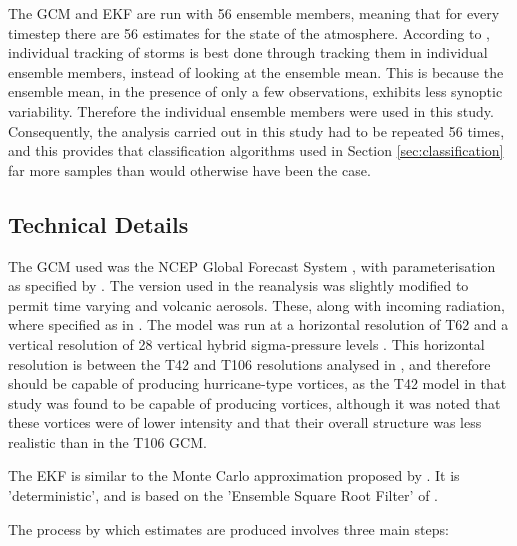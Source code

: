 \documentclass[pdftex,12pt,a4paper]{report}
\begin{document}
The GCM and EKF are run with 56 ensemble members, meaning that for every timestep there are 56
estimates for the state of the atmosphere. According to \textcite{compoTwentieth2011}, individual
tracking of storms is best done through tracking them in individual ensemble members, instead of
looking at the ensemble mean. This is because the ensemble mean, in the presence of only a few
observations, exhibits less synoptic variability. %
Therefore the individual ensemble members were used in this study. Consequently, the analysis
carried out in this study had to be repeated 56 times, and this provides that classification
algorithms used in Section \ref{sec:classification} far more samples than would otherwise have been
the case.

\subsection{Technical Details}

The GCM used was the NCEP Global Forecast System \parencite{TODOCITE}, with parameterisation as
specified by \textcite{saha2006}. The version used in the reanalysis was slightly modified to permit
time varying  and volcanic aerosols. These, along with incoming radiation, where specified
as in \textcite{saha2010}. The model was run at a horizontal resolution of T62 and a vertical
resolution of 28 vertical hybrid sigma-pressure levels \parencite{juang2005}. This horizontal
resolution is between the T42 and T106 resolutions analysed in \textcite{bengtsson1995}, and
therefore should be capable of producing hurricane-type vortices, as the T42 model in that study
was found to be capable of producing vortices, although it was noted that these vortices were of
lower intensity and that their overall structure was less realistic than in the T106 GCM. 

The EKF is similar to the Monte Carlo approximation proposed by \textcite{evensen1994}. It is
'deterministic', and is based on the 'Ensemble Square Root Filter' of \textcite{whitaker2002}.

The process by which estimates are produced involves three main steps: 
\end{document}
